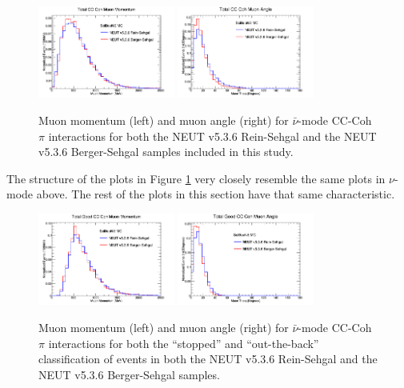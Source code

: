 \documentclass[11pt]{article}
\begin{document}
\begin{figure}[H]
\centering
\includegraphics[width=0.4\textwidth]{CCCohPlots/ANMCCCohTotalMomentum.png}
\includegraphics[width=0.4\textwidth]{CCCohPlots/ANMCCCohTotalAngle.png}
\caption{Muon momentum (left) and muon angle (right) for $\bar{\nu}$-mode CC-Coh $\pi$ interactions for both the NEUT v5.3.6 Rein-Sehgal and the NEUT v5.3.6 Berger-Sehgal samples included in this study.}
\label{fig:AntiNuModeCCCohTotalMomAndAng}
\end{figure}

The structure of the plots in Figure \ref*{fig:AntiNuModeCCCohTotalMomAndAng} very closely resemble the same plots in $\nu$-mode above. The rest of the plots in this section have that same characteristic.

\begin{figure}[H]
\centering
\includegraphics[width=0.4\textwidth]{CCCohPlots/ANMCCCohGoodMomentum.png}
\includegraphics[width=0.4\textwidth]{CCCohPlots/ANMCCCohGoodAngle.png}
\caption{Muon momentum (left) and muon angle (right) for $\bar{\nu}$-mode CC-Coh $\pi$ interactions for both the ``stopped'' and ``out-the-back'' classification of events in both the NEUT v5.3.6 Rein-Sehgal and the NEUT v5.3.6 Berger-Sehgal samples.}
\label{fig:AntiNuModeCCCohGoodMomAndAng}
\end{figure}
\end{document}
